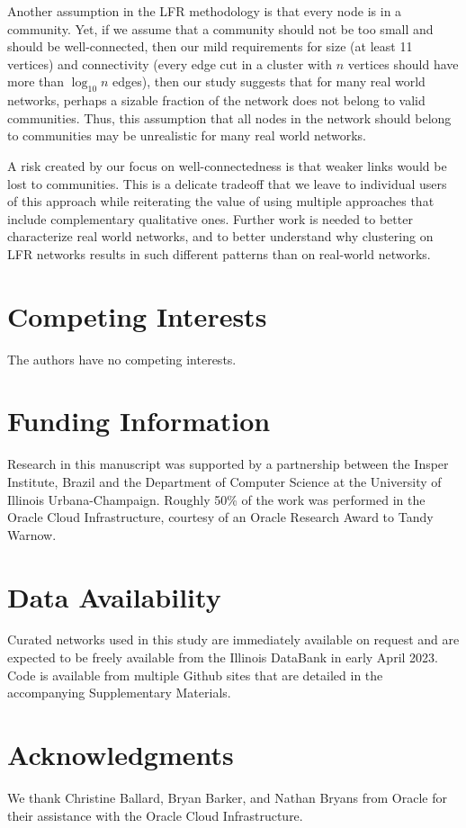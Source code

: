 \documentclass[11pt]{article}   	%
\begin{document}
Another assumption in the LFR methodology is that every node is in a community.  Yet, if we assume that a community should not be too small and should be well-connected, then
our mild requirements for size (at least 11 vertices) and connectivity (every edge cut in a cluster with $n$ vertices should have more than $\log_{10}n$ edges), then our
study suggests that for many real world networks, perhaps a sizable fraction of the network does not belong to valid communities.
Thus, this assumption that all nodes in the network should belong to communities may be unrealistic for many real world networks.

A risk created by our focus on well-connectedness is that weaker links \cite{granovetter1973strength} would be lost to communities. This is a delicate tradeoff that we leave to individual users of this approach while reiterating the value of using multiple approaches that include complementary qualitative ones. Further work is needed to better characterize real world networks, and to better understand why clustering on LFR networks results in such different patterns than on real-world networks.


\section*{Competing Interests} \vspace{3mm} The authors have no competing interests.

\section*{Funding Information} Research in this manuscript was supported by a partnership between the Insper Institute, Brazil and the Department of Computer Science at the University of Illinois Urbana-Champaign. Roughly
50\% of the work was performed in the Oracle Cloud Infrastructure, courtesy of an Oracle Research Award to Tandy Warnow.

\section*{Data Availability}
Curated networks used in this study are immediately available on request and are expected to be freely available from the Illinois DataBank in early April 2023. Code is available from multiple Github sites that are detailed in the accompanying
Supplementary Materials.

\section*{Acknowledgments} We thank Christine Ballard, Bryan Barker, and Nathan Bryans from Oracle for their assistance with the Oracle Cloud Infrastructure.



\end{document}
